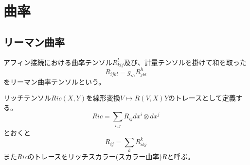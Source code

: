 

\section{曲率}
    \subsection{リーマン曲率}
        アフィン接続における曲率テンソル$R^l_{kij}$及び、計量テンソルを掛けて和を取った
            \[R_{ijkl} = g_{ih}R^h_{jkl}\]
        をリーマン曲率テンソルという。

        リッチテンソル$Ric(X, Y)$を線形変換$V \mapsto R(V, X)Y$のトレースとして定義する。
            \[Ric = \sum_{i,j} R_{ij}dx^i \otimes dx^j\]
        とおくと
            \[R_{ij} = \sum_k R^k_{ikj}\]
        また$Ric$のトレースをリッチスカラー(スカラー曲率)$R$と呼ぶ。

